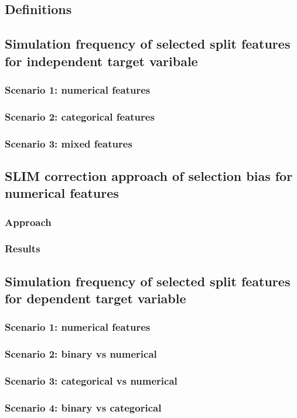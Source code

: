 \subsection{Definitions}

\subsection{Simulation frequency of selected split features for independent target varibale}
\subsubsection{Scenario 1: numerical features}
\subsubsection{Scenario 2: categorical features}
\subsubsection{Scenario 3: mixed features}
\subsection{SLIM correction approach of selection bias for numerical features}
\subsubsection{Approach}
\subsubsection{Results}

\subsection{Simulation frequency of selected split features for dependent target variable}
\subsubsection{Scenario 1: numerical features}
\subsubsection{Scenario 2: binary vs numerical}
\subsubsection{Scenario 3: categorical vs  numerical}
\subsubsection{Scenario 4: binary vs  categorical}


